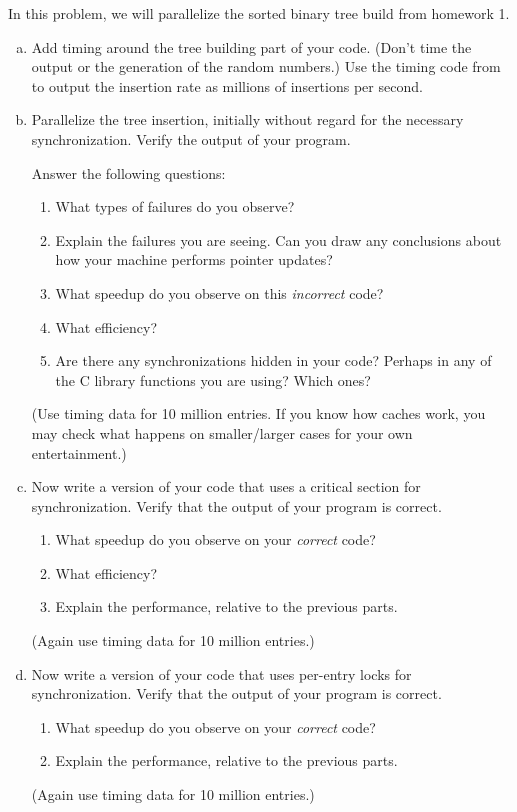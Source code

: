 \documentclass[11pt]{article}
\begin{document}
\bigskip
{}

In this problem, we will parallelize the sorted binary tree build from
homework 1.

\begin{enumerate}[a)]
  \item Add timing around the tree building part of your code. (Don't
  time the output or the generation of the random numbers.)
  Use the timing code from
  to output the insertion rate as millions of insertions per second.

  \item Parallelize the tree insertion, initially without regard for
  the necessary synchronization. Verify the output of your program.

  Answer the following questions:
  \begin{enumerate}[1)]
    \item What types of failures do you observe?
    \item Explain the failures you are seeing. Can you draw any
      conclusions about how your machine performs pointer updates?
    \item What speedup do you observe on this \emph{incorrect} code?
    \item What efficiency?
    \item Are there any synchronizations hidden in your code? Perhaps
      in any of the C library functions you are using? Which ones?
  \end{enumerate}
  (Use timing data for 10 million entries. If you know how caches
  work, you may check what happens on smaller/larger cases for your
  own entertainment.)

  \item Now write a version of your code that uses a critical section
  for synchronization. Verify that the output of your program is
  correct.
  \begin{enumerate}[1)]
    \item What speedup do you observe on your \emph{correct} code?
    \item What efficiency?
    \item Explain the performance, relative to the previous
    parts.
  \end{enumerate}
  (Again use timing data for 10 million entries.)

  \item Now write a version of your code that uses per-entry locks
  for synchronization. Verify that the output of your program is
  correct.
  \begin{enumerate}[1)]
    \item What speedup do you observe on your \emph{correct} code?
    \item Explain the performance, relative to the previous
    parts.
  \end{enumerate}
  (Again use timing data for 10 million entries.)


\end{enumerate}
\end{document}
